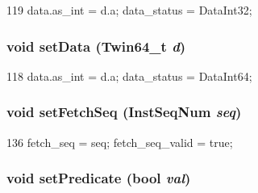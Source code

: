 \begin{DoxyCode}
119 { data.as_int = d.a; data_status = DataInt32; }
\end{DoxyCode}
\hypertarget{classTrace_1_1InstRecord_a6e6b9d43995b55f7d6229fa14e832a4f}{
\subsubsection[{setData}]{\setlength{\rightskip}{0pt plus 5cm}void setData ({\bf Twin64\_\-t} {\em d})}}
\label{classTrace_1_1InstRecord_a6e6b9d43995b55f7d6229fa14e832a4f}



\begin{DoxyCode}
118 { data.as_int = d.a; data_status = DataInt64; }
\end{DoxyCode}
\hypertarget{classTrace_1_1InstRecord_a6a2a2c4c9142ba6924aff9399759ad32}{
\subsubsection[{setFetchSeq}]{\setlength{\rightskip}{0pt plus 5cm}void setFetchSeq ({\bf InstSeqNum} {\em seq})}}
\label{classTrace_1_1InstRecord_a6a2a2c4c9142ba6924aff9399759ad32}



\begin{DoxyCode}
136     { fetch_seq = seq; fetch_seq_valid = true; }
\end{DoxyCode}
\hypertarget{classTrace_1_1InstRecord_a137a8c6cced89c2ff8387900439436b4}{
\subsubsection[{setPredicate}]{\setlength{\rightskip}{0pt plus 5cm}void setPredicate (bool {\em val})}}
\label{classTrace_1_1InstRecord_a137a8c6cced89c2ff8387900439436b4}



